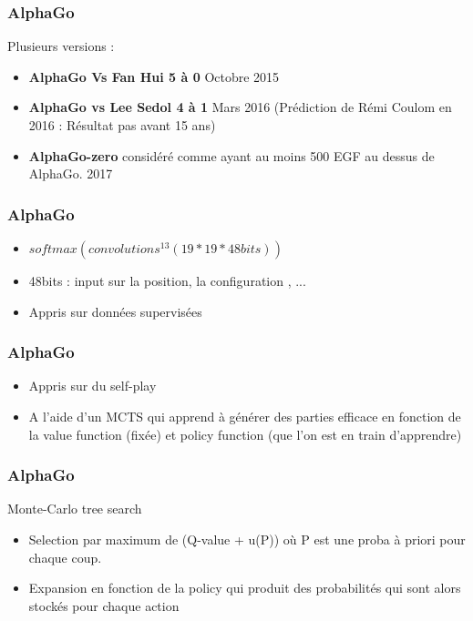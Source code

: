 \documentclass{formation}
\begin{document}
\begin{frame}
  \frametitle{AlphaGo}
  Plusieurs versions :
  \begin{itemize}
  \item \textbf{AlphaGo Vs Fan Hui 5 à 0} Octobre 2015
  \item \textbf{AlphaGo vs Lee Sedol 4 à 1} Mars 2016 (Prédiction de Rémi Coulom en 2016 : Résultat pas avant 15 ans)
  \item \textbf{AlphaGo-zero} considéré comme ayant au moins 500 EGF au dessus de AlphaGo. 2017
  \end{itemize}
\end{frame}

\begin{frame}
  \frametitle{AlphaGo}
  \begin{minipage}[c]{0.50\linewidth}
    \begin{itemize}
    \item $softmax(convolutions^{13}(19*19*48{bits}))$
    \item 48bits : input sur la position, la configuration , ...
    \item Appris sur données supervisées
    \end{itemize}
  \end{minipage}\hfill
  \begin{minipage}[c]{0.49\linewidth}
  \end{minipage}\hfill
\end{frame}

\begin{frame}
  \frametitle{AlphaGo}
  \begin{minipage}[c]{0.50\linewidth}
  \end{minipage}\hfill
  \begin{minipage}[c]{0.49\linewidth}
    \begin{itemize}
    \item Appris sur du self-play
    \item A l'aide d'un MCTS qui apprend à générer des parties efficace en fonction de la value function (fixée) et policy function (que l'on est en train d'apprendre)
    \end{itemize}
  \end{minipage}\hfill
\end{frame}

\begin{frame}
  \frametitle{AlphaGo}
  Monte-Carlo tree search
  \begin{itemize}
  \item Selection par maximum de (Q-value + u(P)) où P est une proba à priori pour chaque coup.
  \item Expansion en fonction de la policy qui produit des probabilités qui sont alors stockés pour chaque action
  \end{itemize}
\end{frame}
\end{document}
